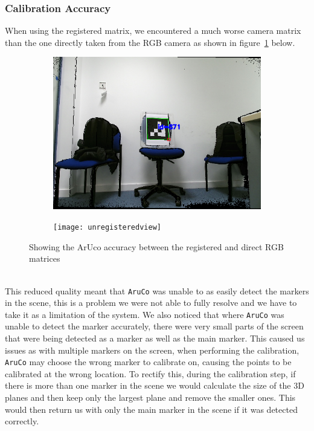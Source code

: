 \documentclass{article}
\begin{document}
\subsubsection{Calibration Accuracy}
When using the registered matrix, we encountered a much worse camera matrix than the one directly taken from the RGB camera as shown in figure~\ref{fig:registeredaccuracy} below.
\begin{figure}[h]
\centering
\begin{subfigure}{.49\textwidth}
  \centering
  \includegraphics[scale=0.5]{registeredview}
\end{subfigure}
\begin{subfigure}{.49\textwidth}
  \centering
  \texttt{[image: unregisteredview]}
\end{subfigure}
  \caption{Showing the ArUco \cite{aruco} accuracy between the registered and direct RGB matrices}
  \label{fig:registeredaccuracy}
\end{figure}
\\
This reduced quality meant that \texttt{AruCo} \cite{aruco} was unable to as easily detect the markers in the scene, this is a problem we were not able to fully resolve and we have to take it as a limitation of the system. We also noticed that where \texttt{AruCo} \cite{aruco} was unable to detect the marker accurately, there were very small parts of the screen that were being detected as a marker as well as the main marker. This caused us issues as with multiple markers on the screen, when performing the calibration, \texttt{AruCo} \cite{aruco} may choose the wrong marker to calibrate on, causing the points to be calibrated at the wrong location. To rectify this, during the calibration step, if there is more than one marker in the scene we would calculate the size of the 3D planes and then keep only the largest plane and remove the smaller ones. This would then return us with only the main marker in the scene if it was detected correctly.
\end{document}
